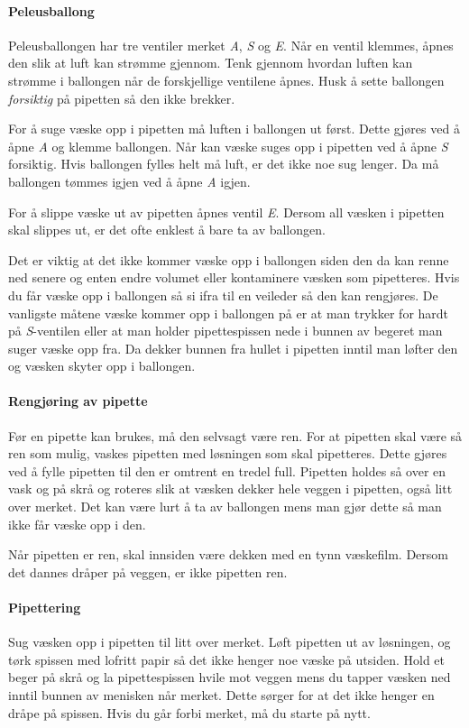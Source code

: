 \documentclass[hidelinks,12pt,norsk,a4paper,fleqn]{scrartcl}
\begin{document}
	\paragraph{Peleusballong}
	Peleusballongen har tre ventiler merket \emph{A}, \emph{S} og \emph{E}. Når en ventil klemmes, åpnes den slik at luft kan strømme gjennom. Tenk gjennom hvordan luften kan strømme i ballongen når de forskjellige ventilene åpnes. Husk å sette ballongen \emph{forsiktig} på pipetten så den ikke brekker.
	
	For å suge væske opp i pipetten må luften i ballongen ut først. Dette gjøres ved å åpne \emph{A} og klemme ballongen. Når kan væske suges opp i pipetten ved å åpne \emph{S} forsiktig. Hvis ballongen fylles helt må luft, er det ikke noe sug lenger. Da må ballongen tømmes igjen ved å åpne \emph{A} igjen.
	
	For å slippe væske ut av pipetten åpnes ventil \emph{E}. Dersom all væsken i pipetten skal slippes ut, er det ofte enklest å bare ta av ballongen.
	
	Det er viktig at det ikke kommer væske opp i ballongen siden den da kan renne ned senere og enten endre volumet eller kontaminere væsken som pipetteres. Hvis du får væske opp i ballongen så si ifra til en veileder så den kan rengjøres. De vanligste måtene væske kommer opp i ballongen på er at man trykker for hardt på \emph{S}-ventilen eller at man holder pipettespissen nede i bunnen av begeret man suger væske opp fra. Da dekker bunnen fra hullet i pipetten inntil man løfter den og væsken skyter opp i ballongen.
	
	\paragraph{Rengjøring av pipette}
	Før en pipette kan brukes, må den selvsagt være ren. For at pipetten skal være så ren som mulig, vaskes pipetten med løsningen som skal pipetteres. Dette gjøres ved å fylle pipetten til den er omtrent en tredel full. Pipetten holdes så over en vask og på skrå og roteres slik at væsken dekker hele veggen i pipetten, også litt over merket. Det kan være lurt å ta av ballongen mens man gjør dette så man ikke får væske opp i den.
	
	Når pipetten er ren, skal innsiden være dekken med en tynn væskefilm. Dersom det dannes dråper på veggen, er ikke pipetten ren.
	
	\paragraph{Pipettering}
	Sug væsken opp i pipetten til litt over merket. Løft pipetten ut av løsningen, og tørk spissen med lofritt papir så det ikke henger noe væske på utsiden. Hold et beger på skrå og la pipettespissen hvile mot veggen mens du tapper væsken ned inntil bunnen av menisken når merket. Dette sørger for at det ikke henger en dråpe på spissen. Hvis du går forbi merket, må du starte på nytt.
	
\end{document}
